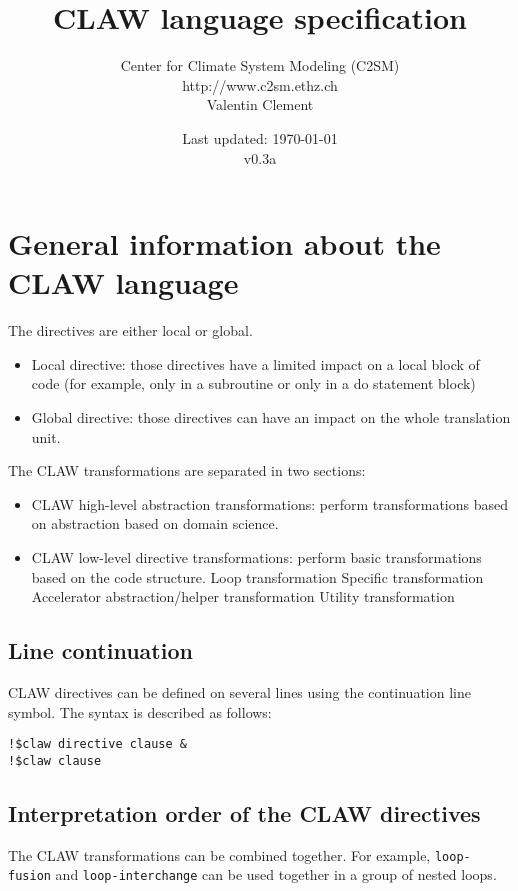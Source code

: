 \documentclass{article}
\title{CLAW language specification}
\author{Center for Climate System Modeling (C2SM)\\http://www.c2sm.ethz.ch\\Valentin Clement}
\date{Last updated: \today \\\vspace{1em}v0.3a}
\begin{document}
\maketitle


\tableofcontents

\section{General information about the CLAW language}
The directives are either local or global.

\begin{itemize}
\item Local directive: those directives have a limited impact on a local block of
code (for example, only in a subroutine or only in a do statement block)
\item Global directive: those directives can have an impact on the whole
translation unit.
\end{itemize}

The CLAW transformations are separated in two sections:
\begin{itemize}
\item CLAW high-level abstraction transformations: perform transformations based on abstraction based on domain science. 
\item CLAW low-level directive transformations: perform basic transformations based on the code structure.
\subitem Loop transformation
\subitem Specific transformation
\subitem Accelerator abstraction/helper transformation
\subitem Utility transformation
\end{itemize}

\subsection{Line continuation}
CLAW directives can be defined on several lines using the continuation line symbol. The syntax is described as follows:

\begin{lstlisting}
!$claw directive clause &
!$claw clause
\end{lstlisting}


\subsection{Interpretation order of the CLAW directives}
The CLAW transformations can be combined together. For example, \lstinline!loop-fusion! and \lstinline!loop-interchange! can be used together in a group of nested loops.
\end{document}
